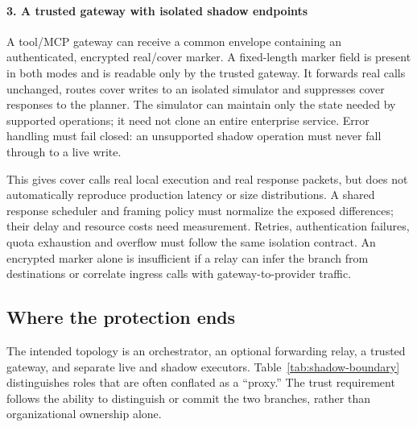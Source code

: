 \paragraph{3. A trusted gateway with isolated shadow endpoints}
A tool/MCP gateway can receive a common envelope containing an authenticated, encrypted real/cover marker. A fixed-length marker field is present in both modes and is readable only by the trusted gateway. It forwards real calls unchanged, routes cover writes to an isolated simulator and suppresses cover responses to the planner. The simulator can maintain only the state needed by supported operations; it need not clone an entire enterprise service. Error handling must fail closed: an unsupported shadow operation must never fall through to a live write.

This gives cover calls real local execution and real response packets, but does not automatically reproduce production latency or size distributions. A shared response scheduler and framing policy must normalize the exposed differences; their delay and resource costs need measurement. Retries, authentication failures, quota exhaustion and overflow must follow the same isolation contract. An encrypted marker alone is insufficient if a relay can infer the branch from destinations or correlate ingress calls with gateway-to-provider traffic.

\subsection{Where the protection ends}
The intended topology is an orchestrator, an optional forwarding relay, a trusted gateway, and separate live and shadow executors. Table~\ref{tab:shadow-boundary} distinguishes roles that are often conflated as a ``proxy.'' The trust requirement follows the ability to distinguish or commit the two branches, rather than organizational ownership alone.

